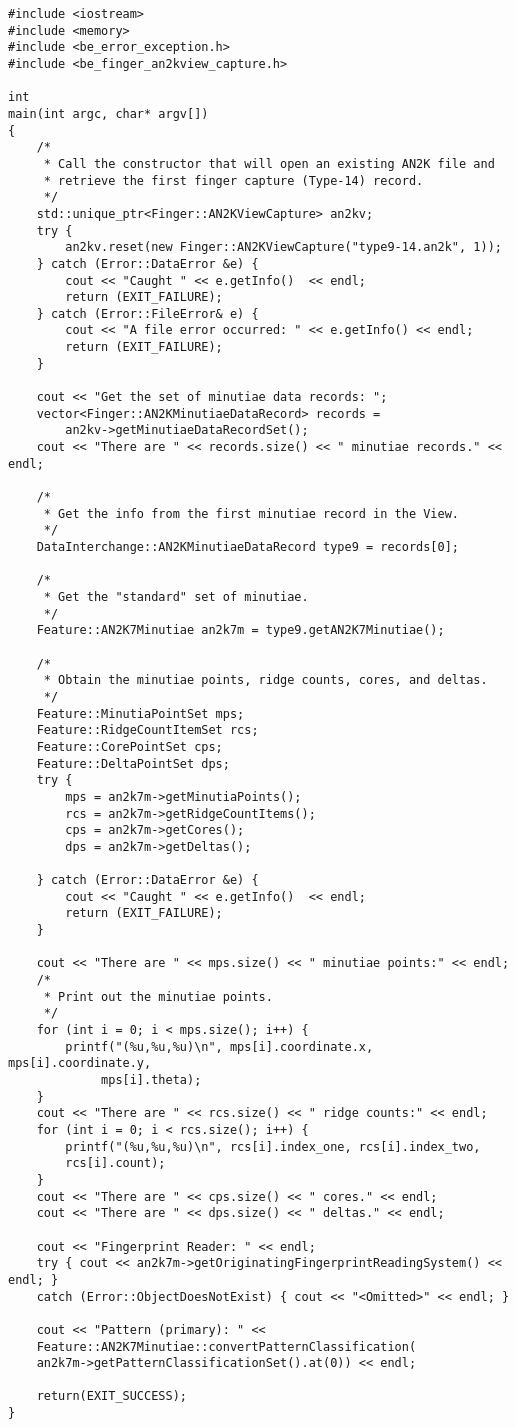 \begin{lstlisting}[caption={Retrieving ANSI/NIST Finger Captures}, label=lst:an2kviewuse]
#include <iostream>
#include <memory>
#include <be_error_exception.h>
#include <be_finger_an2kview_capture.h>

int
main(int argc, char* argv[])
{
    /*
     * Call the constructor that will open an existing AN2K file and
     * retrieve the first finger capture (Type-14) record.
     */
    std::unique_ptr<Finger::AN2KViewCapture> an2kv;
    try {
        an2kv.reset(new Finger::AN2KViewCapture("type9-14.an2k", 1));
    } catch (Error::DataError &e) {
        cout << "Caught " << e.getInfo()  << endl;
        return (EXIT_FAILURE);
    } catch (Error::FileError& e) {
        cout << "A file error occurred: " << e.getInfo() << endl;
        return (EXIT_FAILURE);
    }

    cout << "Get the set of minutiae data records: ";
    vector<Finger::AN2KMinutiaeDataRecord> records =
        an2kv->getMinutiaeDataRecordSet();
    cout << "There are " << records.size() << " minutiae records." << endl;

    /*
     * Get the info from the first minutiae record in the View.
     */
    DataInterchange::AN2KMinutiaeDataRecord type9 = records[0];

    /*
     * Get the "standard" set of minutiae.
     */
    Feature::AN2K7Minutiae an2k7m = type9.getAN2K7Minutiae();

    /*
     * Obtain the minutiae points, ridge counts, cores, and deltas.
     */
    Feature::MinutiaPointSet mps;
    Feature::RidgeCountItemSet rcs;
    Feature::CorePointSet cps;
    Feature::DeltaPointSet dps;
    try {
        mps = an2k7m->getMinutiaPoints();
        rcs = an2k7m->getRidgeCountItems();
        cps = an2k7m->getCores();
        dps = an2k7m->getDeltas();

    } catch (Error::DataError &e) {
        cout << "Caught " << e.getInfo()  << endl;
        return (EXIT_FAILURE);
    }

    cout << "There are " << mps.size() << " minutiae points:" << endl;
    /*
     * Print out the minutiae points.
     */
    for (int i = 0; i < mps.size(); i++) {
        printf("(%u,%u,%u)\n", mps[i].coordinate.x, mps[i].coordinate.y,
             mps[i].theta);
    }
    cout << "There are " << rcs.size() << " ridge counts:" << endl;
    for (int i = 0; i < rcs.size(); i++) {
        printf("(%u,%u,%u)\n", rcs[i].index_one, rcs[i].index_two,
        rcs[i].count);
    }
    cout << "There are " << cps.size() << " cores." << endl;
    cout << "There are " << dps.size() << " deltas." << endl;

    cout << "Fingerprint Reader: " << endl;
    try { cout << an2k7m->getOriginatingFingerprintReadingSystem() << endl; }
    catch (Error::ObjectDoesNotExist) { cout << "<Omitted>" << endl; }

    cout << "Pattern (primary): " <<
    Feature::AN2K7Minutiae::convertPatternClassification(
    an2k7m->getPatternClassificationSet().at(0)) << endl;

    return(EXIT_SUCCESS);
}
\end{lstlisting}

